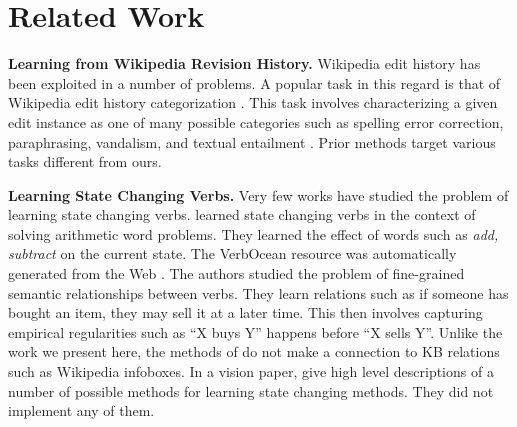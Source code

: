 \section{Related Work}

\textbf{Learning from Wikipedia Revision History.}
Wikipedia edit history has been exploited in a number of problems.
  A popular task in this regard is that of
Wikipedia edit history categorization \cite{daxenberger2013automatically}.  This task
involves characterizing  a given edit instance as one of many possible categories 
such as spelling error correction, paraphrasing, vandalism,  and textual entailment \cite{Nelken08miningwikipedia,Cahill13robustsystems,Zanzotto_expandingtextual,RecasensDJ13}.
Prior methods target various tasks different from ours.

\textbf{Learning State Changing Verbs.}
Very few works have studied the problem of learning state changing verbs.
\cite{HosseiniHEK14} learned state changing verbs in the context of solving arithmetic word problems.
They learned the effect of  words such as \textit{add, subtract} on  the current state. 
The VerbOcean resource was automatically generated from the Web \cite{Chklovski04}. The authors  studied the problem of fine-grained semantic relationships between verbs. They learn relations such as  if someone has bought an item, they may sell it at a later time. This then involves capturing empirical regularities such as  ``X buys Y'' happens before ``X
sells Y''. Unlike the work we present here, the methods of \cite{Chklovski04,HosseiniHEK14}  do not make a connection to KB relations such as Wikipedia infoboxes.
In a vision paper, \cite{Wijaya2014akbc} give high level descriptions of  a number of possible methods for learning state changing methods. They  did not implement any of them.